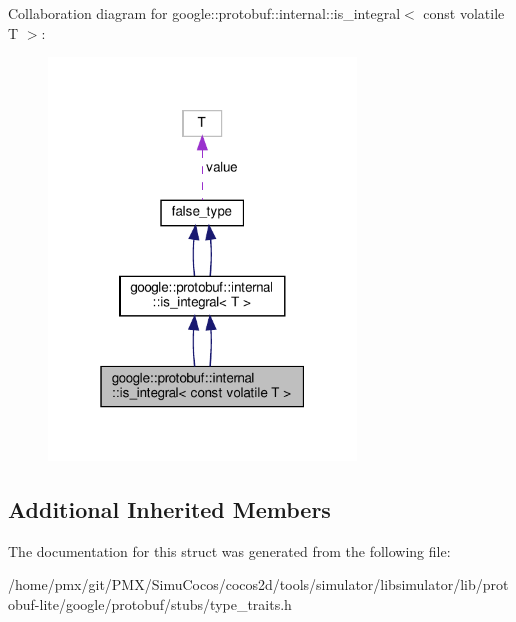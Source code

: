 Collaboration diagram for google\+:\+:protobuf\+:\+:internal\+:\+:is\+\_\+integral$<$ const volatile T $>$\+:
\nopagebreak
\begin{figure}[H]
\begin{center}
\leavevmode
\includegraphics[width=232pt]{structgoogle_1_1protobuf_1_1internal_1_1is__integral_3_01const_01volatile_01T_01_4__coll__graph}
\end{center}
\end{figure}
\subsection*{Additional Inherited Members}


The documentation for this struct was generated from the following file\+:\begin{DoxyCompactItemize}
\item 
/home/pmx/git/\+P\+M\+X/\+Simu\+Cocos/cocos2d/tools/simulator/libsimulator/lib/protobuf-\/lite/google/protobuf/stubs/type\+\_\+traits.\+h\end{DoxyCompactItemize}
